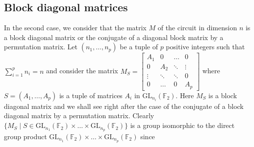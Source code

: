 \documentclass[a4paper,12pt,fleqn]{article}
\newcommand\GL[1][n]{\mathrm{GL}_{#1}(\mathbb{F}_2)}
\begin{document}
\subsection{Block diagonal matrices}
  In the second case, we consider that the matrix $M$ of the circuit in dimension $n$ is a block diagonal matrix or the conjugate of a diagonal block matrix by a permutation matrix.
  Let $(n_1,\dots, n_p)$ be a tuple of $p$
  positive integers such that $\sum_{i=1}^pn_i=n$ and consider the matrix
  $M_S=\begin{bmatrix}A_1&0&\dots&0\\
    0&A_2&\ddots&\vdots\\
    \vdots&\ddots&\ddots&0\\
    0&\dots&0&A_p
  \end{bmatrix}$ where $S=(A_1,\dots,A_p)$ is a tuple of matrices $A_i$ in $\GL[n_i]$. Here $M_S$ is a block diagonal matrix and we shall see right after the case of the conjugate of a block diagonal matrix by a permutation matrix. Clearly $\{M_S\mid S\in\GL[n_1]\times\dots\times\GL[n_p]\}$ is a group isomorphic to the direct group product $\GL[n_1]\times\dots\times\GL[n_p]$ since
\end{document}
